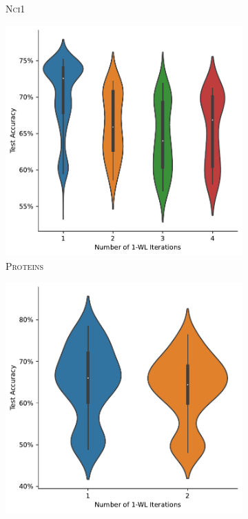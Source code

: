 \begin{figure}
\begin{subfigure}[b]{0.19\textwidth}
        \caption{\scriptsize\textsc{Nci1}}
	\end{subfigure}
	\hfill
	\begin{subfigure}[b]{0.19\textwidth}
		\centering
		\includegraphics[width=\textwidth]{Figures/k_wl_violin_PROTEINS.pdf}
        \caption{\scriptsize\textsc{Proteins}}
	\end{subfigure}
	\par\bigskip
	\begin{subfigure}[b]{0.19\textwidth}
		\centering
		\includegraphics[width=\textwidth]{Figures/k_wl_violin_REDDIT-BINARY.pdf}

\end{subfigure}
\end{figure}
